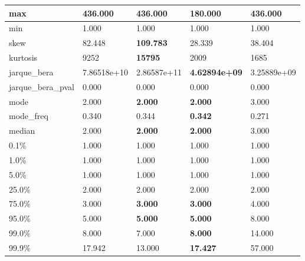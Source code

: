 \begin{table}[H]
\begin{tabular}{|l|m{10em}|m{10em}|m{10em}|m{10em}|}
\hline max & 436.000 & \bfseries 436.000 & \cellcolor[rgb]{0.9, 0.54, 0.52} 180.000 & \bfseries 436.000 \\
\hline min & 1.000 & 1.000 & 1.000 & 1.000 \\
\hline skew & 82.448 & \bfseries 109.783 & \cellcolor[rgb]{0.9, 0.54, 0.52} 28.339 & 38.404 \\
\hline kurtosis & 9252 & \bfseries 15795 & 2009 & \cellcolor[rgb]{0.9, 0.54, 0.52} 1685 \\
\hline jarque\_bera & 7.86518e+10 & \cellcolor[rgb]{0.9, 0.54, 0.52} 2.86587e+11 & \bfseries 4.62894e+09 & 3.25889e+09 \\
\hline jarque\_bera\_pval & 0.000 & 0.000 & 0.000 & 0.000 \\
\hline mode & 2.000 & \bfseries 2.000 & \bfseries 2.000 & \cellcolor[rgb]{0.9, 0.54, 0.52} 3.000 \\
\hline mode\_freq & 0.340 & 0.344 & \bfseries 0.342 & \cellcolor[rgb]{0.9, 0.54, 0.52} 0.271 \\
\hline median & 2.000 & \bfseries 2.000 & \bfseries 2.000 & \cellcolor[rgb]{0.9, 0.54, 0.52} 3.000 \\
\hline 0.1\% & 1.000 & 1.000 & 1.000 & 1.000 \\
\hline 1.0\% & 1.000 & 1.000 & 1.000 & 1.000 \\
\hline 5.0\% & 1.000 & 1.000 & 1.000 & 1.000 \\
\hline 25.0\% & 2.000 & 2.000 & 2.000 & 2.000 \\
\hline 75.0\% & 3.000 & \bfseries 3.000 & \bfseries 3.000 & \cellcolor[rgb]{0.9, 0.54, 0.52} 4.000 \\
\hline 95.0\% & 5.000 & \bfseries 5.000 & \bfseries 5.000 & \cellcolor[rgb]{0.9, 0.54, 0.52} 8.000 \\
\hline 99.0\% & 8.000 & 7.000 & \bfseries 8.000 & \cellcolor[rgb]{0.9, 0.54, 0.52} 14.000 \\
\hline 99.9\% & 17.942 & 13.000 & \bfseries 17.427 & \cellcolor[rgb]{0.9, 0.54, 0.52} 57.000 \\
\hline
\end{tabular}
\end{table}
